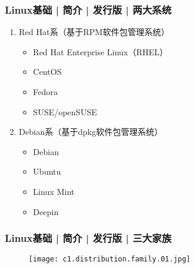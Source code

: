 \begin{frame}
  \frametitle{Linux基础 | 简介 | 发行版 | \alert{两大系统}}
  \begin{enumerate}
    \item Red Hat系（基于RPM软件包管理系统）
      \begin{itemize}
        \item Red Hat Enterprise Linux（RHEL）
        \item CentOS
        \item Fedora
        \item SUSE/openSUSE
      \end{itemize}
    \item Debian系（基于dpkg软件包管理系统）
      \begin{itemize}
        \item Debian
        \item Ubuntu
        \item Linux Mint
        \item Deepin
      \end{itemize}
  \end{enumerate}
\end{frame}

\begin{frame}
  \frametitle{Linux基础 | 简介 | 发行版 | \alert{三大家族}}
  \begin{figure}
    \centering
    \texttt{[image: c1.distribution.family.01.jpg]}
  \end{figure}
\end{frame}

